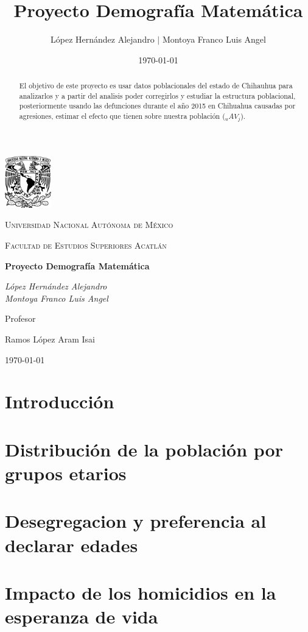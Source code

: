 \documentclass[fontsize=11pt]{article}
\title{Proyecto Demografía Matemática}
\author{  López Hernández Alejandro $|$ Montoya Franco Luis Angel} %
\date{\normalsize\today} %
\begin{document}
\begin{titlepage}
	\centering
	\includegraphics[width=0.15\textwidth]{UNAM}\par\vspace{1cm}
	{\scshape\LARGE Universidad Nacional Autónoma de México\par}
	\vspace{1cm}
	{\scshape\Large Facultad de Estudios Superiores Acatlán\par}
	\vspace{1.5cm}
	{\huge\bfseries Proyecto Demografía Matemática \par}
	\vspace{2cm}
	{\Large\itshape López Hernández Alejandro \\ Montoya Franco Luis Angel\par}
	\vfill
	Profesor\par
	Ramos López Aram Isai

	\vfill

	{\large \today\par}
\end{titlepage}
\begin{abstract}
   El objetivo de este proyecto es usar datos poblacionales del estado de Chihauhua para analizarlos y a partir del analisis poder corregirlos y estudiar la estructura poblacional, posteriormente usando las defunciones durante el año 2015 en Chihuahua causadas por agresiones, estimar el efecto que tienen sobre nuestra población ($_u AV_{j}$). 
\end{abstract}

\section*{Introducción}

\section*{Distribución de la población por grupos etarios}
\section*{Desegregacion y preferencia al declarar edades}
\section*{Impacto de los homicidios en la esperanza de vida}
\end{document}
